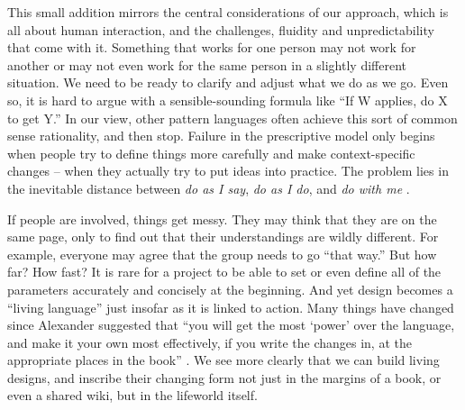 
This small addition mirrors the central considerations of our approach, which is all about human interaction, and the challenges, fluidity and unpredictability that come with it.  Something that works for one person may not work for another or may not even work for the same person in a slightly different situation.  We need to be ready to clarify and adjust what we do as we go.   Even so, it is hard to argue with a sensible-sounding formula like ``If W applies, do X to get Y.'' In our view, other pattern languages often achieve this sort of common sense rationality, and then stop.  Failure in the prescriptive model only begins when people try to define things more carefully and make context-specific changes -- when they actually try to put ideas into practice.  The problem lies in the inevitable distance between \emph{do as I say}, \emph{do as I do}, and \emph{do with me} \cite[p.~26]{deleuze1994difference}.

If people are involved, things get messy.   They may think that they are on the same page, only to find out that their understandings are wildly different.  For  example, everyone may agree that the group needs to go ``that way.''  But how far?  How fast?  It is rare for a project to be able to set or even define all of the parameters accurately and concisely at the beginning.
And yet design becomes a ``living language'' \cite[p.~xvii]{alexander1977pattern}  just insofar as it is linked to action.  Many things have changed since Alexander suggested that ``you will get the most `power' over the language, and make it your own most effectively, if you write the changes in, at the appropriate places in the book'' \cite[p.~xl]{alexander1977pattern}.  We see more clearly that we can build living designs, and inscribe their changing form not just in the margins of a book, or even a shared wiki, but in the lifeworld itself.  


